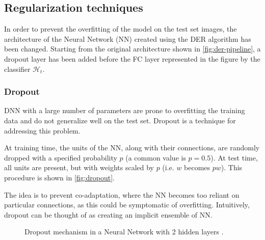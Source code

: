 \subsection{Regularization techniques}
In order to prevent the overfitting of the model on the test set images, the architecture of the Neural Network (NN) created using the DER algorithm has been changed. Starting from the original architecture shown in \autoref{fig:der-pipeline}, a dropout layer has been added before the FC layer represented in the figure by the classifier $\mathcal{H}_t$.

\subsubsection{Dropout}
DNN with a large number of parameters are prone to overfitting the training data and do not generalize well on the test set.
Dropout \cite{srivastava2014dropout} is a technique for addressing this problem.

At training time, the units of the NN, along with their connections, are randomly dropped with a specified probability $p$ (a common value is $p = 0.5$). At test time, all units are present, but with weights scaled by $p$ (i.e. $w$ becomes $pw$). This procedure is shown in \autoref{fig:dropout}.

The idea is to prevent co-adaptation, where the NN becomes too reliant on particular connections, as this could be symptomatic of overfitting. Intuitively, dropout can be thought of as creating an implicit ensemble of NN.

\begin{figure}%
	\centering
	\hspace*{2cm}
	\caption{Dropout mechanism in a Neural Network with 2 hidden layers \cite{srivastava2014dropout}.}%
	\label{fig:dropout}%
\end{figure}

